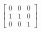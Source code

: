 \[
  \left[
  \begin{array}{ccc}
	  0 & 0 & 0 \\
	  1 & 1 & 0 \\
	  0 & 0 & 1
  \end{array}
  \right]
  \]